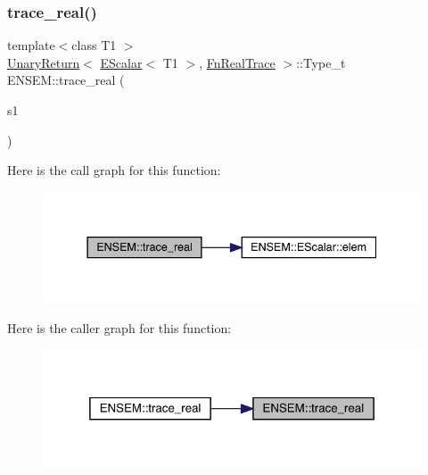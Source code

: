 \subsubsection{\texorpdfstring{trace\_real()}{trace\_real()}}
{\footnotesize\ttfamily template$<$class T1 $>$ \\
\mbox{\hyperlink{structENSEM_1_1UnaryReturn}{Unary\+Return}}$<$ \mbox{\hyperlink{classENSEM_1_1EScalar}{E\+Scalar}}$<$ T1 $>$, \mbox{\hyperlink{structENSEM_1_1FnRealTrace}{Fn\+Real\+Trace}} $>$\+::Type\+\_\+t E\+N\+S\+E\+M\+::trace\+\_\+real (\begin{DoxyParamCaption}\item[{const \mbox{\hyperlink{classENSEM_1_1EScalar}{E\+Scalar}}$<$ T1 $>$ \&}]{s1 }\end{DoxyParamCaption})\hspace{0.3cm}{\ttfamily [inline]}}

Here is the call graph for this function\+:
\nopagebreak
\begin{figure}[H]
\begin{center}
\leavevmode
\includegraphics[width=337pt]{d4/dca/group__escalar_gac6853fb7b9f9b61b97cda696c804ab0a_cgraph}
\end{center}
\end{figure}
Here is the caller graph for this function\+:
\nopagebreak
\begin{figure}[H]
\begin{center}
\leavevmode
\includegraphics[width=319pt]{d4/dca/group__escalar_gac6853fb7b9f9b61b97cda696c804ab0a_icgraph}
\end{center}
\end{figure}
\mbox{\label{group__escalar_ga5b02d7d8a00b851a2452fb03861a9401}} 
